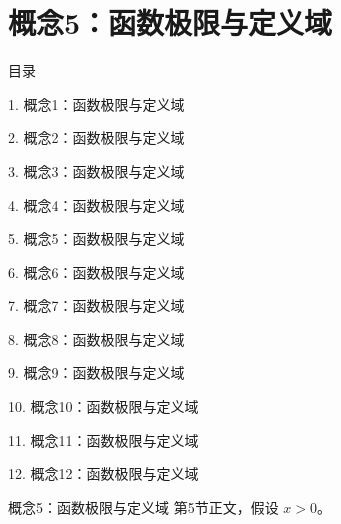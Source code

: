 \documentclass[aspectratio=169,10pt,fontset=fandol]{ctexbeamer}
\begin{document}
\section{概念5：函数极限与定义域}
\begin{frame}[t,fragile]{目录}
\small
{\color{black}\small 1. 概念1：函数极限与定义域\par}\vspace{0.22em}
{\color{black}\small 2. 概念2：函数极限与定义域\par}\vspace{0.22em}
{\color{black}\small 3. 概念3：函数极限与定义域\par}\vspace{0.22em}
{\color{black}\small 4. 概念4：函数极限与定义域\par}\vspace{0.22em}
{\color{blue}\small 5. 概念5：函数极限与定义域\par}\vspace{0.22em}
{\color{gray!40}\small 6. 概念6：函数极限与定义域\par}\vspace{0.22em}
{\color{gray!40}\small 7. 概念7：函数极限与定义域\par}\vspace{0.22em}
{\color{gray!40}\small 8. 概念8：函数极限与定义域\par}\vspace{0.22em}
{\color{gray!40}\small 9. 概念9：函数极限与定义域\par}\vspace{0.22em}
{\color{gray!40}\small 10. 概念10：函数极限与定义域\par}\vspace{0.22em}
{\color{gray!40}\small 11. 概念11：函数极限与定义域\par}\vspace{0.22em}
{\color{gray!40}\small 12. 概念12：函数极限与定义域\par}\vspace{0.22em}
\end{frame}
\begin{frame}[t,fragile]{概念5：函数极限与定义域}
\normalsize
{\normalsize
第5节正文，假设 $x>0$。
}
\end{frame}
\end{document}
